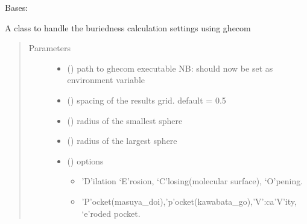 \documentclass[letterpaper,10pt,english]{sphinxmanual}
\begin{document}
\begin{fulllineitems}
\begin{fulllineitems}
\label{\detokenize{calculation_api:hotspots.calculation.Buriedness.Settings}}
Bases: 

A class to handle the buriedness calculation settings using ghecom
\begin{quote}\begin{description}
\item[{Parameters}] \leavevmode\begin{itemize}
\item {} 
 () \textendash{} path to ghecom executable NB: should now be set as environment variable

\item {} 
 () \textendash{} spacing of the results grid. default = 0.5

\item {} 
 () \textendash{} radius of the smallest sphere

\item {} 
 () \textendash{} radius of the largest sphere

\item {} 
 () \textendash{} 
options
\begin{itemize}
\item {} 
’D’ilation ‘E’rosion, ‘C’losing(molecular surface), ‘O’pening.

\item {} 
’P’ocket(masuya\_doi),’p’ocket(kawabata\_go),’V’:ca’V’ity, ‘e’roded pocket.


\end{itemize}
\end{itemize}
\end{description}
\end{quote}
\end{fulllineitems}
\end{fulllineitems}
\end{document}
